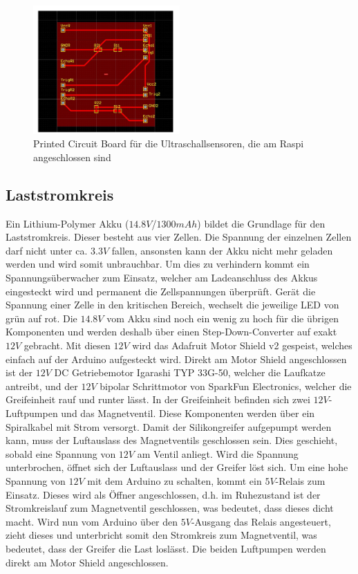 \begin{figure}
    \centering
    \includegraphics[width=0.5\textwidth]{pics/schaltung.jpg}
    \caption{Printed Circuit Board für die Ultraschallsensoren, die am Raspi angeschlossen sind}
    \label{fig:schaltung}
\end{figure}

\subsection{Laststromkreis}

Ein Lithium-Polymer Akku ($14.8V$/$1300mAh$) bildet die Grundlage für den Laststromkreis. Dieser besteht aus vier Zellen. Die Spannung der einzelnen Zellen darf nicht unter ca. $3.3V$ fallen, ansonsten kann der Akku nicht mehr geladen werden und wird somit unbrauchbar. Um dies zu verhindern kommt ein Spannungsüberwacher zum Einsatz, welcher am Ladeanschluss des Akkus eingesteckt wird und permanent die Zellspannungen überprüft. Gerät die Spannung einer Zelle in den kritischen Bereich, wechselt die jeweilige LED von grün auf rot.
Die $14.8V$ vom Akku sind noch ein wenig zu hoch für die übrigen Komponenten und werden deshalb über einen Step-Down-Converter auf exakt $12V$ gebracht. Mit diesen $12V$ wird das Adafruit Motor Shield v2 gespeist, welches einfach auf der Arduino aufgesteckt wird. Direkt am Motor Shield angeschlossen ist der $12V$ DC Getriebemotor Igarashi TYP 33G-50, welcher die Laufkatze antreibt, und der $12V$ bipolar Schrittmotor von SparkFun Electronics, welcher die Greifeinheit rauf und runter lässt.
In der Greifeinheit befinden sich zwei $12V$-Luftpumpen und das Magnetventil. Diese Komponenten werden über ein Spiralkabel mit Strom versorgt. Damit der Silikongreifer aufgepumpt werden kann, muss der Luftauslass des Magnetventils geschlossen sein. Dies geschieht, sobald eine Spannung von $12V$ am Ventil anliegt. Wird die Spannung unterbrochen, öffnet sich der Luftauslass und der Greifer löst sich. Um eine hohe Spannung von $12V$ mit dem Arduino zu schalten, kommt ein $5V$-Relais zum Einsatz. Dieses wird als Öffner angeschlossen, d.h. im Ruhezustand ist der Stromkreislauf zum Magnetventil geschlossen, was bedeutet, dass dieses dicht macht. Wird nun vom Arduino über den $5V$-Ausgang das Relais angesteuert, zieht dieses und unterbricht somit den Stromkreis zum Magnetventil, was bedeutet, dass der Greifer die Last loslässt. Die beiden Luftpumpen werden direkt am Motor Shield angeschlossen.

